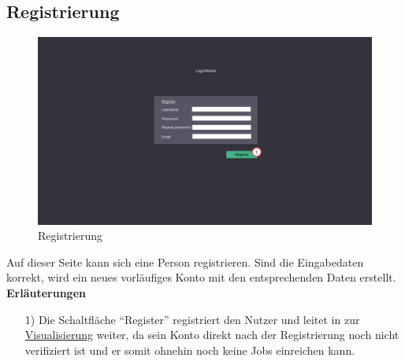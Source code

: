\subsection{Registrierung}
\label{pages:register}
\begin{figure}[H]
    \centering
    \includegraphics[width=\textwidth]{images-interface/v4_interface/register_page_4.pdf}
    \caption{Registrierung}
    \label{fig:register}
\end{figure}
Auf dieser Seite kann sich eine Person registrieren. Sind die Eingabedaten korrekt, wird ein neues vorläufiges Konto mit den entsprechenden Daten erstellt. \\


\textbf{Erläuterungen}
\begin{itemize}
    \item[1)] Die Schaltfläche \enquote{Register} registriert den Nutzer und leitet in zur \hyperref[pages:visualization]{Visualisierung} weiter, da sein Konto direkt nach der Registrierung noch nicht verifiziert ist und er somit ohnehin noch keine Jobs einreichen kann.
\end{itemize}



\newpage
